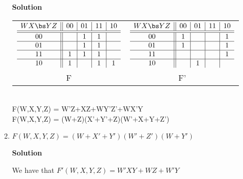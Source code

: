 \begin{enumerate}
\begin{enumerate}
\begin{onlysolution}  \textbf{Solution} \itshape{
\begin{tabular}{cc}
$\begin{array} {c||c|c|c|c}
   W X \bs Y Z   & 00 & 01 & 11 & 10 \\ \hline \hline
       00        &    & 1  & 1  &    \\ \hline
       01        &    & 1  & 1  &    \\ \hline
       11        & 1  & 1  & 1  &    \\ \hline
       10        & 1  &    & 1  & 1  \\
\end{array}$ &
$\begin{array} {c||c|c|c|c}
   W X \bs Y Z   & 00 & 01 & 11 & 10 \\ \hline \hline
       00        & 1  &    &    & 1  \\ \hline
       01        & 1  &    &    & 1  \\ \hline
       11        &    &    &    & 1  \\ \hline
       10        &    & 1  &    &    \\
\end{array}$ \\
F  & F' \\
\end{tabular} \\
\SOPmin F(W,X,Y,Z) =  W'Z+XZ+WY'Z'+WX'Y\\
\POSmin F(W,X,Y,Z) = (W+Z)(X'+Y'+Z)(W'+X+Y+Z')
} \end{onlysolution} 

\item  $F(W,X,Y,Z) = (W + X'+Y')(W'+Z')(W+Y')$

\begin{onlysolution}  \textbf{Solution} \itshape{

We have that $F'(W,X,Y,Z) = W'XY+ WZ+ W'Y$

}
\end{onlysolution}
\end{enumerate}
\end{enumerate}
